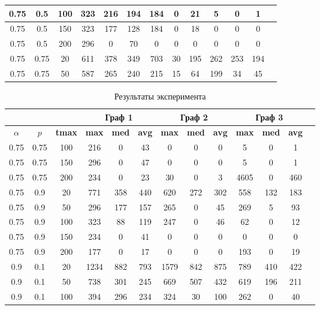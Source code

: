 \begin{table}[H]
\begin{tabular}{|c|c|c|c|c|c|c|c|c|c|c|c|c|}
0.75 & 0.5 & 100 & 323 & 216 & 194 & 184 & 0 & 21 & 5 & 0 & 1 \\ \hline
0.75 & 0.5 & 150 & 323 & 177 & 128 & 184 & 0 & 18 & 0 & 0 & 0 \\ \hline
0.75 & 0.5 & 200 & 296 & 0 & 70 & 0 & 0 & 0 & 0 & 0 & 0 \\ \hline
0.75 & 0.75 & 20 & 611 & 378 & 349 & 703 & 30 & 195 & 262 & 253 & 194 \\ \hline
0.75 & 0.75 & 50 & 587 & 265 & 240 & 215 & 15 & 64 & 199 & 34 & 45 \\ \hline
\end{tabular}
\label{tab:experiment_results}
\end{table}


\begin{table}[H]
\centering
\caption{Результаты эксперимента}
\begin{tabular}{|c|c|c|c|c|c|c|c|c|c|c|c|c|}
\hline
\multicolumn{3}{|c|}{} & \multicolumn{3}{|c|}{Граф 1} & \multicolumn{3}{|c|}{Граф 2} & \multicolumn{3}{|c|}{Граф 3} \\ \hline
\textbf{\boldmath$\alpha$} & \textbf{\boldmath$p$} & \textbf{tmax} & \textbf{max} & \textbf{med} & \textbf{avg} & \textbf{max} & \textbf{med} & \textbf{avg} & \textbf{max} & \textbf{med} & \textbf{avg} \\ \hline
0.75 & 0.75 & 100 & 216 & 0 & 43 & 0 & 0 & 0 & 5 & 0 & 1 \\ \hline
0.75 & 0.75 & 150 & 296 & 0 & 47 & 0 & 0 & 0 & 5 & 0 & 1 \\ \hline
0.75 & 0.75 & 200 & 234 & 0 & 23 & 30 & 0 & 3 & 4605 & 0 & 460 \\ \hline
0.75 & 0.9 & 20 & 771 & 358 & 440 & 620 & 272 & 302 & 558 & 132 & 183 \\ \hline
0.75 & 0.9 & 50 & 296 & 177 & 157 & 265 & 0 & 45 & 269 & 5 & 93 \\ \hline
0.75 & 0.9 & 100 & 323 & 88 & 119 & 247 & 0 & 46 & 62 & 0 & 12 \\ \hline
0.75 & 0.9 & 150 & 234 & 0 & 41 & 0 & 0 & 0 & 0 & 0 & 0 \\ \hline
0.75 & 0.9 & 200 & 177 & 0 & 17 & 0 & 0 & 0 & 193 & 0 & 19 \\ \hline
0.9 & 0.1 & 20 & 1234 & 882 & 793 & 1579 & 842 & 875 & 789 & 410 & 422 \\ \hline
0.9 & 0.1 & 50 & 738 & 301 & 245 & 669 & 507 & 432 & 619 & 196 & 211 \\ \hline
0.9 & 0.1 & 100 & 394 & 296 & 234 & 324 & 30 & 100 & 262 & 0 & 40 \\ \hline

\end{tabular}
\end{table}
